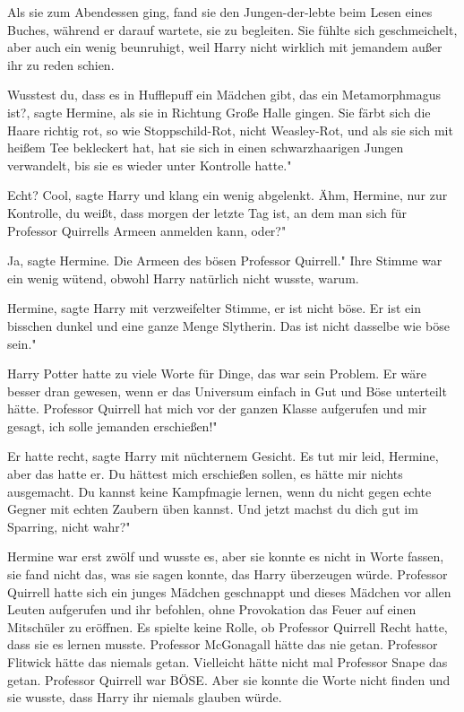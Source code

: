 Als sie zum Abendessen ging, fand sie den Jungen-der-lebte beim Lesen eines
Buches, während er darauf wartete, sie zu begleiten. Sie fühlte sich
geschmeichelt, aber auch ein wenig beunruhigt, weil Harry nicht wirklich mit
jemandem außer ihr zu reden schien.

\glqq Wusstest du, dass es in Hufflepuff ein Mädchen gibt, das ein
Metamorphmagus ist?\grqq{}, sagte Hermine, als sie in Richtung Große Halle
gingen. \glqq Sie färbt sich die Haare richtig rot, so wie Stoppschild-Rot,
nicht Weasley-Rot, und als sie sich mit heißem Tee bekleckert hat, hat sie sich
in einen schwarzhaarigen Jungen verwandelt, bis sie es wieder unter Kontrolle
hatte."

\glqq Echt? Cool\grqq{}, sagte Harry und klang ein wenig abgelenkt. \glqq Ähm,
Hermine, nur zur Kontrolle, du weißt, dass morgen der letzte Tag ist, an dem man
sich für Professor Quirrells Armeen anmelden kann, oder?"

\glqq Ja\grqq{}, sagte Hermine. \glqq Die Armeen des bösen Professor Quirrell."
Ihre Stimme war ein wenig wütend, obwohl Harry natürlich nicht wusste, warum.

\glqq Hermine\grqq{}, sagte Harry mit verzweifelter Stimme, \glqq er ist nicht
böse. Er ist ein bisschen dunkel und eine ganze Menge Slytherin. Das ist nicht
dasselbe wie böse sein."

Harry Potter hatte zu viele Worte für Dinge, das war sein Problem. Er wäre
besser dran gewesen, wenn er das Universum einfach in Gut und Böse unterteilt
hätte. \glqq Professor Quirrell hat mich vor der ganzen Klasse aufgerufen und
mir gesagt, ich solle jemanden erschießen!"

\glqq Er hatte recht\grqq{}, sagte Harry mit nüchternem Gesicht. \glqq Es tut
mir leid, Hermine, aber das hatte er. Du hättest mich erschießen sollen, es
hätte mir nichts ausgemacht. Du kannst keine Kampfmagie lernen, wenn du nicht
gegen echte Gegner mit echten Zaubern üben kannst. Und jetzt machst du dich gut
im Sparring, nicht wahr?"

Hermine war erst zwölf und wusste es, aber sie konnte es nicht in Worte fassen,
sie fand nicht das, was sie sagen konnte, das Harry überzeugen würde. Professor
Quirrell hatte sich ein junges Mädchen geschnappt und dieses Mädchen vor allen
Leuten aufgerufen und ihr befohlen, ohne Provokation das Feuer auf einen
Mitschüler zu eröffnen. Es spielte keine Rolle, ob Professor Quirrell Recht
hatte, dass sie es lernen musste. Professor McGonagall hätte das nie getan.
Professor Flitwick hätte das niemals getan. Vielleicht hätte nicht mal Professor
Snape das getan. Professor Quirrell war BÖSE. Aber sie konnte die Worte nicht
finden und sie wusste, dass Harry ihr niemals glauben würde.

